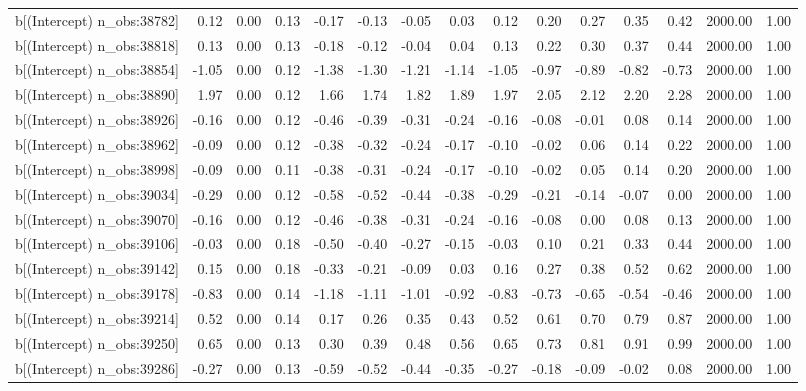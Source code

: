 \begin{table}[ht]
\begin{tabular}{rrrrrrrrrrrrrrr}
  b[(Intercept) n\_obs:38782] & 0.12 & 0.00 & 0.13 & -0.17 & -0.13 & -0.05 & 0.03 & 0.12 & 0.20 & 0.27 & 0.35 & 0.42 & 2000.00 & 1.00 \\ 
  b[(Intercept) n\_obs:38818] & 0.13 & 0.00 & 0.13 & -0.18 & -0.12 & -0.04 & 0.04 & 0.13 & 0.22 & 0.30 & 0.37 & 0.44 & 2000.00 & 1.00 \\ 
  b[(Intercept) n\_obs:38854] & -1.05 & 0.00 & 0.12 & -1.38 & -1.30 & -1.21 & -1.14 & -1.05 & -0.97 & -0.89 & -0.82 & -0.73 & 2000.00 & 1.00 \\ 
  b[(Intercept) n\_obs:38890] & 1.97 & 0.00 & 0.12 & 1.66 & 1.74 & 1.82 & 1.89 & 1.97 & 2.05 & 2.12 & 2.20 & 2.28 & 2000.00 & 1.00 \\ 
  b[(Intercept) n\_obs:38926] & -0.16 & 0.00 & 0.12 & -0.46 & -0.39 & -0.31 & -0.24 & -0.16 & -0.08 & -0.01 & 0.08 & 0.14 & 2000.00 & 1.00 \\ 
  b[(Intercept) n\_obs:38962] & -0.09 & 0.00 & 0.12 & -0.38 & -0.32 & -0.24 & -0.17 & -0.10 & -0.02 & 0.06 & 0.14 & 0.22 & 2000.00 & 1.00 \\ 
  b[(Intercept) n\_obs:38998] & -0.09 & 0.00 & 0.11 & -0.38 & -0.31 & -0.24 & -0.17 & -0.10 & -0.02 & 0.05 & 0.14 & 0.20 & 2000.00 & 1.00 \\ 
  b[(Intercept) n\_obs:39034] & -0.29 & 0.00 & 0.12 & -0.58 & -0.52 & -0.44 & -0.38 & -0.29 & -0.21 & -0.14 & -0.07 & 0.00 & 2000.00 & 1.00 \\ 
  b[(Intercept) n\_obs:39070] & -0.16 & 0.00 & 0.12 & -0.46 & -0.38 & -0.31 & -0.24 & -0.16 & -0.08 & 0.00 & 0.08 & 0.13 & 2000.00 & 1.00 \\ 
  b[(Intercept) n\_obs:39106] & -0.03 & 0.00 & 0.18 & -0.50 & -0.40 & -0.27 & -0.15 & -0.03 & 0.10 & 0.21 & 0.33 & 0.44 & 2000.00 & 1.00 \\ 
  b[(Intercept) n\_obs:39142] & 0.15 & 0.00 & 0.18 & -0.33 & -0.21 & -0.09 & 0.03 & 0.16 & 0.27 & 0.38 & 0.52 & 0.62 & 2000.00 & 1.00 \\ 
  b[(Intercept) n\_obs:39178] & -0.83 & 0.00 & 0.14 & -1.18 & -1.11 & -1.01 & -0.92 & -0.83 & -0.73 & -0.65 & -0.54 & -0.46 & 2000.00 & 1.00 \\ 
  b[(Intercept) n\_obs:39214] & 0.52 & 0.00 & 0.14 & 0.17 & 0.26 & 0.35 & 0.43 & 0.52 & 0.61 & 0.70 & 0.79 & 0.87 & 2000.00 & 1.00 \\ 
  b[(Intercept) n\_obs:39250] & 0.65 & 0.00 & 0.13 & 0.30 & 0.39 & 0.48 & 0.56 & 0.65 & 0.73 & 0.81 & 0.91 & 0.99 & 2000.00 & 1.00 \\ 
  b[(Intercept) n\_obs:39286] & -0.27 & 0.00 & 0.13 & -0.59 & -0.52 & -0.44 & -0.35 & -0.27 & -0.18 & -0.09 & -0.02 & 0.08 & 2000.00 & 1.00 \\ 

\end{tabular}
\end{table}
